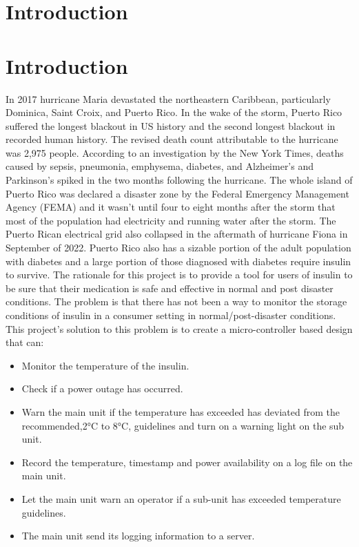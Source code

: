 \section{Introduction}
\section{Introduction}
In 2017 hurricane Maria devastated the northeastern Caribbean, particularly Dominica, Saint Croix, and Puerto Rico. In the wake of the storm, Puerto Rico suffered the longest blackout in US history and the second longest blackout in recorded human history\cite{WorldSecondLargest}. The revised death count attributable to the hurricane was 2,975 people\cite{HurricaneMariaCaused2018}. According to an investigation by the New York Times, deaths caused by  sepsis, pneumonia, emphysema, diabetes, and Alzheimer's and Parkinson's spiked in the two months following the hurricane\cite{roblesOfficialTollPuerto2017}. The whole island of Puerto Rico was declared a disaster zone by the Federal Emergency Management Agency (FEMA) and it wasn't until four to eight months after the storm that most of the population had electricity and running water after the storm. The Puerto Rican electrical grid also collapsed in the aftermath of hurricane Fiona in September of 2022. Puerto Rico also has a sizable portion of the adult population with diabetes and a large portion of those diagnosed with diabetes require insulin to survive\cite{DiabetesPrevalencePopulation}. The rationale for this project is to provide a tool for users of insulin to be sure that their medication is safe and effective in normal and post disaster conditions. The problem is that there has not been a way to monitor the storage conditions of insulin in a consumer setting in normal/post-disaster conditions. This project's solution to this problem is to create a micro-controller based design that can:
\begin{itemize}
  \item Monitor the temperature of the insulin.
  \item Check if a power outage has occurred.
  \item Warn the main unit if the temperature has exceeded has deviated from the recommended,2\si{\celsius} to 8\si{\celsius}, guidelines and turn on a warning light on the sub unit.
  \item Record the temperature, timestamp and power availability on a log file on the main unit.
  \item Let the main unit warn an operator if a sub-unit has exceeded temperature guidelines.
  \item The main unit send its logging information to a server.
\end{itemize}
